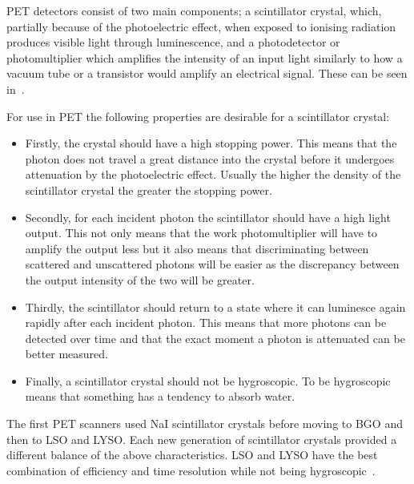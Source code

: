                PET detectors consist of two main components; a scintillator crystal, which, partially because of the photoelectric effect, when exposed to ionising radiation produces visible light through luminescence, and a photodetector or photomultiplier which amplifies the intensity of an input light similarly to how a vacuum tube or a transistor would amplify an electrical signal. These can be seen in~.
                
                For use in \gls{PET} the following properties are desirable for a scintillator crystal:
                
                \begin{itemize}
                    \item Firstly, the crystal should have a high stopping power. This means that the photon does not travel a great distance into the crystal before it undergoes attenuation by the photoelectric effect. Usually the higher the density of the scintillator crystal the greater the stopping power.
                    
                    \item Secondly, for each incident photon the scintillator should have a high light output. This not only means that the work photomultiplier will have to amplify the output less but it also means that discriminating between scattered and unscattered photons will be easier as the discrepancy between the output intensity of the two will be greater.
                    
                    \item Thirdly, the scintillator should return to a state where it can luminesce again rapidly after each incident photon. This means that more photons can be detected over time and that the exact moment a photon is attenuated can be better measured.
                    
                    \item Finally, a scintillator crystal should not be hygroscopic. To be hygroscopic means that something has a tendency to absorb water.
                \end{itemize}
                
                The first \gls{PET} scanners used \gls{NaI} scintillator crystals before moving to \gls{BGO} and then to \gls{LSO} and \gls{LYSO}. Each new generation of scintillator crystals provided a different balance of the above characteristics. \gls{LSO} and \gls{LYSO} have the best combination of efficiency and time resolution while not being hygroscopic~.
                
